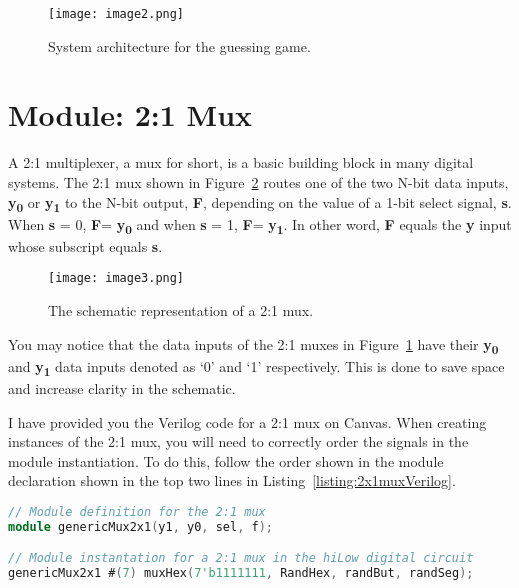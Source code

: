 \begin{figure}[ht]
\texttt{[image: image2.png]}
\caption{System architecture for the guessing game.}
\label{fig:guessGameSysArch}
\end{figure}

\hypertarget{mux-module}{%
\section{Module: 2:1 Mux}\label{mux-module}}

A 2:1 multiplexer, a mux for short, is a basic building block in many
digital systems. The 2:1 mux shown in Figure~\ref{fig:2x1MuxSymbol} routes one of the two
N-bit data inputs, \textbf{y\textsubscript{0}} or
\textbf{y\textsubscript{1}} to the N-bit output, \textbf{F}, depending
on the value of a 1-bit select signal, \textbf{s}. When \textbf{s} = 0,
\textbf{F}= \textbf{y\textsubscript{0}} and when \textbf{s} = 1,
\textbf{F}= \textbf{y\textsubscript{1}}. In other word, \textbf{F}
equals the \textbf{y} input whose subscript equals \textbf{s}.

\begin{figure}[ht]
\texttt{[image: image3.png]}
\caption{The schematic representation of a 2:1 mux.}
\label{fig:2x1MuxSymbol}
\end{figure}

You may notice that the data inputs of the 2:1 muxes in Figure~\ref{fig:guessGameSysArch}
 have
their \textbf{y\textsubscript{0}} and \textbf{y\textsubscript{1}} data
inputs denoted as `0' and `1' respectively. This is done to save space
and increase clarity in the schematic.

I have provided you the Verilog code for a 2:1 mux on Canvas. When
creating instances of the 2:1 mux, you will need to correctly order the
signals in the module instantiation. To do this, follow the
order shown in the module declaration shown in the top two lines in
Listing~\ref{listing:2x1muxVerilog}.

\begin{lstlisting}[language=Verilog,
 caption={Top, module definition for a 2:1 mux.  Bottom, module instantation 
 of a 2:1 mux in Figure~\ref{fig:guessGameSysArch}.},
 label={listing:2x1muxVerilog},
 frame=single]
// Module definition for the 2:1 mux
module genericMux2x1(y1, y0, sel, f);

// Module instantation for a 2:1 mux in the hiLow digital circuit
genericMux2x1 #(7) muxHex(7'b1111111, RandHex, randBut, randSeg);
\end{lstlisting}

